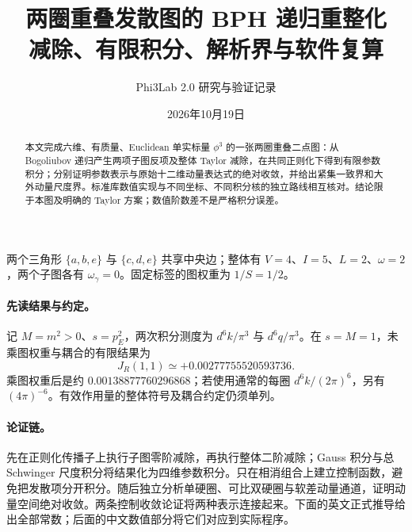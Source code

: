 \documentclass[UTF8,fontset=fandol,11pt]{ctexart}
\title{两圈重叠发散图的 BPH 递归重整化\\\large 减除、有限积分、解析界与软件复算}
\author{Phi3Lab 2.0 研究与验证记录}
\date{2026年10月19日}
\begin{document}
\maketitle
\begin{abstract}
本文完成六维、有质量、Euclidean 单实标量 $\phi^3$ 的一张两圈重叠二点图：从 Bogoliubov 递归产生两项子图反项及整体 Taylor 减除，在共同正则化下得到有限参数积分；分别证明参数表示与原始十二维动量表达式的绝对收敛，并给出紧集一致界和大外动量尺度界。标准库数值实现与不同坐标、不同积分核的独立路线相互核对。结论限于本图及明确的 Taylor 方案；数值阶数差不是严格积分误差。
\end{abstract}
\begin{center}
\end{center}
两个三角形 $\{a,b,e\}$ 与 $\{c,d,e\}$ 共享中央边；整体有 $V=4$、$I=5$、$L=2$、$\omega=2$，两个子图各有 $\omega_\gamma=0$。固定标签的图权重为 $1/S=1/2$。

\paragraph{先读结果与约定。}
记 $M=m^2>0$、$s=p_E^2$，两次积分测度为 $d^6k/\pi^3$ 与 $d^6q/\pi^3$。在 $s=M=1$，未乘图权重与耦合的有限结果为
\[
 \boxed{J_R(1,1)\simeq +0.00277755520593736.}
\]
乘图权重后是约 $0.00138877760296868$；若使用通常的每圈 $d^6k/(2\pi)^6$，另有 $(4\pi)^{-6}$。有效作用量的整体符号及耦合约定仍须单列。

\paragraph{论证链。}
先在正则化传播子上执行子图零阶减除，再执行整体二阶减除；Gauss 积分与总 Schwinger 尺度积分将结果化为四维参数积分。只在相消组合上建立控制函数，避免把发散项分开积分。随后独立分析单硬圈、可比双硬圈与软差动量通道，证明动量空间绝对收敛。两条控制收敛论证将两种表示连接起来。下面的英文正式推导给出全部常数；后面的中文数值部分将它们对应到实际程序。
\clearpage
\tableofcontents
\clearpage

\end{document}
